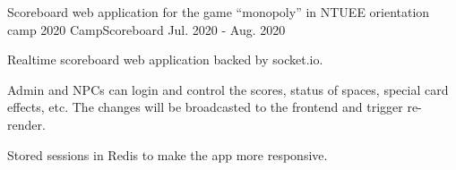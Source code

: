\begin{cventries}
  \cventry
  {Scoreboard web application for the game “monopoly” in NTUEE orientation camp 2020}
  {CampScoreboard \href{https://github.com/MortalHappiness/CampScoreboard}{\color{red}{[GitHub Link]}}}
  {}
  {Jul. 2020 - Aug. 2020} %
  {
    \begin{cvitems} %
      \item {Realtime scoreboard web application backed by socket.io.}
      \item {Admin and NPCs can login and control the scores, status of spaces, special card effects, etc. The changes will be broadcasted to the frontend and trigger re-render.}
      \item {Stored sessions in Redis to make the app more responsive.}
    \end{cvitems}
  }


\end{cventries}
